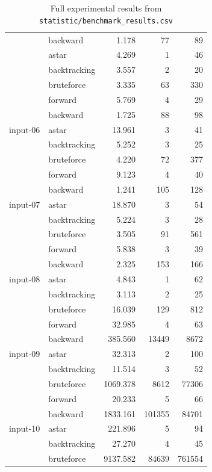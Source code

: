\documentclass[12pt,a4paper]{article}
\begin{document}
\begin{table}[H]
\begin{tabular}{|l|l|r|r|r|}
& backward     & 1.178    & 77     & 89 \\
& astar        & 4.269    & 1      & 46 \\
& backtracking & 3.557    & 2      & 20 \\
& bruteforce   & 3.335    & 63     & 330 \\
\hline
\multirow{5}{*}{input-06}
& forward      & 5.769    & 4      & 29 \\
& backward     & 1.725    & 88     & 98 \\
& astar        & 13.961   & 3      & 41 \\
& backtracking & 5.252    & 3      & 25 \\
& bruteforce   & 4.220    & 72     & 377 \\
\hline
\multirow{5}{*}{input-07}
& forward      & 9.123    & 4      & 40 \\
& backward     & 1.241    & 105    & 128 \\
& astar        & 18.870   & 3      & 54 \\
& backtracking & 5.224    & 3      & 28 \\
& bruteforce   & 3.505    & 91     & 561 \\
\hline
\multirow{5}{*}{input-08}
& forward      & 5.838    & 3      & 39 \\
& backward     & 2.325    & 153    & 166 \\
& astar        & 4.843    & 1      & 62 \\
& backtracking & 3.113    & 2      & 25 \\
& bruteforce   & 16.039   & 129    & 812 \\
\hline
\multirow{5}{*}{input-09}
& forward      & 32.985   & 4      & 63 \\
& backward     & 385.560  & 13449  & 8672 \\
& astar        & 32.313   & 2      & 100 \\
& backtracking & 11.514   & 3      & 52 \\
& bruteforce   & 1069.378 & 8612   & 77306 \\
\hline
\multirow{5}{*}{input-10}
& forward      & 20.233   & 5      & 66 \\
& backward     & 1833.161 & 101355 & 84701 \\
& astar        & 221.896  & 5      & 94 \\
& backtracking & 27.270   & 4      & 45 \\
& bruteforce   & 9137.582 & 84639  & 761554 \\
\hline
\end{tabular}
\caption{Full experimental results from \texttt{statistic/benchmark\_results.csv}}
\end{table}
\end{document}
